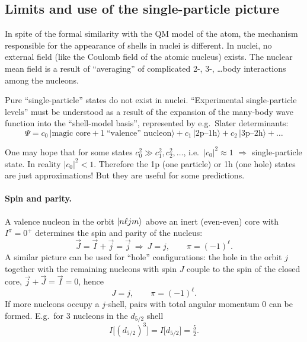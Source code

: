 \documentclass[11pt,a4paper]{article}
\begin{document}
\subsection{Limits and use of the single-particle picture}
In spite of the formal similarity with the QM model of the atom, the mechanism responsible for the appearance of shells in nuclei is different. In nuclei, no external field (like the Coulomb field of the atomic nucleus) exists. The nuclear mean field is a result of ``averaging'' of complicated 2-, 3-, \dots body interactions among the nucleons.

Pure ``single-particle'' states do not exist in nuclei. ``Experimental single-particle levels'' must be understood as a result of the expansion of the many-body wave function into the ``shell-model basis'', represented by e.g.\ Slater determinants:
\[
\Psi=c_0\,\big|\text{magic core}+1\ \text{``valence'' nucleon}\big\rangle
+c_1\,\big|2\text{p--}1\text{h}\big\rangle
+c_2\,\big|3\text{p--}2\text{h}\big\rangle+\dots
\]
\begin{center}
\end{center}
One may hope that for some states $c_0^2\gg c_1^2,c_2^2,\dots$, i.e.\ $|c_0|^2\approx1$ $\Rightarrow$ single-particle state. In reality $|c_0|^2<1$. Therefore the 1p (one particle) or 1h (one hole) states are just approximations! But they are useful for some predictions.

\paragraph{Spin and parity.} A valence nucleon in the orbit $\ket{n\ell jm}$ above an inert (even-even) core with $I^\pi=0^+$ determines the spin and parity of the nucleus:
\[
\vec J=\vec I+\vec j=\vec j\ \Rightarrow\ J=j,\qquad \pi=(-1)^\ell .
\]
A similar picture can be used for ``hole'' configurations: the hole in the orbit $j$ together with the remaining nucleons with spin $J$ couple to the spin of the closed core, $\vec j+\vec J=\vec I=0$, hence
\[
J=j,\qquad \pi=(-1)^\ell .
\]
If more nucleons occupy a $j$-shell, pairs with total angular momentum 0 can be formed. E.g.\ for 3 nucleons in the $d_{5/2}$ shell
\[
I\big[(d_{5/2})^3\big]=I\big[d_{5/2}\big]=\tfrac52 .
\]
\end{document}
